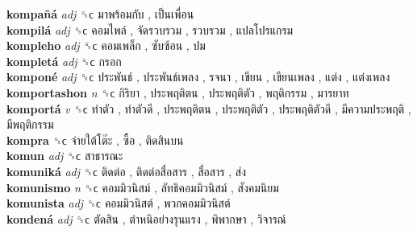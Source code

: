 \textbf{kompañá} \emph{adj}  ␝ϲ   มาพร้อมกับ ,  เป็นเพื่อน   \\
\textbf{kompilá} \emph{adj}  ␝ϲ   คอมไพล์ ,  จัดรวบรวม ,  รวบรวม ,  แปลโปรแกรม   \\
\textbf{kompleho} \emph{adj}  ␝ϲ   คอมเพล็ก ,  ซับซ้อน ,  ปม   \\
\textbf{kompletá} \emph{adj}  ␝ϲ   กรอก   \\
\textbf{komponé} \emph{adj}  ␝ϲ   ประพันธ์ ,  ประพันธ์เพลง ,  รจนา ,  เขียน ,  เขียนเพลง ,  แต่ง ,  แต่งเพลง   \\
\textbf{komportashon} \emph{n}  ␝ϲ   กิริยา ,  ประพฤติตน ,  ประพฤติตัว ,  พฤติกรรม ,  มารยาท   \\
\textbf{komportá} \emph{v}  ␝ϲ   ทำตัว ,  ทำตัวดี ,  ประพฤติตน ,  ประพฤติตัว ,  ประพฤติตัวดี ,  มีความประพฤติ ,  มีพฤติกรรม   \\
\textbf{kompra} ␝ϲ   จ่ายใต้โต๊ะ ,  ซื้อ ,  ติดสินบน   \\
\textbf{komun} \emph{adj}  ␝ϲ   สาธารณะ   \\
\textbf{komuniká} \emph{adj}  ␝ϲ   ติดต่อ ,  ติดต่อสื่อสาร ,  สื่อสาร ,  ส่ง   \\
\textbf{komunismo} \emph{n}  ␝ϲ   คอมมิวนิสม์ ,  ลัทธิคอมมิวนิสม์ ,  สังคมนิยม   \\
\textbf{komunista} \emph{adj}  ␝ϲ   คอมมิวนิสต์ ,  พวกคอมมิวนิสต์   \\
\textbf{kondená} \emph{adj}  ␝ϲ   ตัดสิน ,  ตำหนิอย่างรุนแรง ,  พิพากษา ,  วิจารณ์   \\
